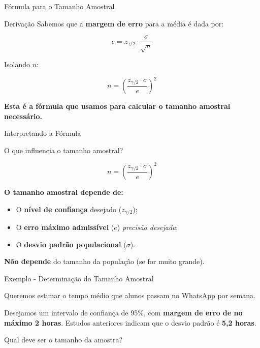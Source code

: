 \documentclass[14pt,aspectratio=1610]{beamer}
\begin{document}
	\begin{frame}{Fórmula para o Tamanho Amostral}
		\begin{block}{Derivação}
			Sabemos que a \textbf{margem de erro} para a média é dada por:
			
			\[
			e = z_{\gamma/2} \cdot \frac{\sigma}{\sqrt{n}}
			\]
			
			Isolando $n$:
			
			\[
			n = \left( \frac{z_{\gamma/2} \cdot \sigma}{e} \right)^2
			\]
			
			\textbf{Esta é a fórmula que usamos para calcular o tamanho amostral necessário.}
		\end{block}
	\end{frame}
	
	\begin{frame}{Interpretando a Fórmula}
		\begin{block}{O que influencia o tamanho amostral?}
			
			\[
			n = \left( \frac{z_{\gamma/2} \cdot \sigma}{e} \right)^2
			\]
			
			\textbf{O tamanho amostral depende de:}
			\begin{itemize}
				\item O \textbf{nível de confiança} desejado ($z_{\gamma/2}$);
				\item O \textbf{erro máximo admissível} ($e$) \textendash{} \textit{precisão desejada};
				\item O \textbf{desvio padrão populacional} ($\sigma$).
			\end{itemize}
			
			\textbf{Não depende} do tamanho da população (se for muito grande).
			
		\end{block}
	\end{frame}
	
	\begin{frame}{Exemplo - Determinação do Tamanho Amostral}
		\begin{block}{}
			\justifying
			Queremos estimar o tempo médio que alunos passam no WhatsApp por semana.
			
			Desejamos um intervalo de confiança de 95\%, com \textbf{margem de erro de no máximo 2 horas}. Estudos anteriores indicam que o desvio padrão é \textbf{5,2 horas}.
			
			Qual deve ser o tamanho da amostra?
		\end{block}
	
	\end{frame}
	
\end{document}
